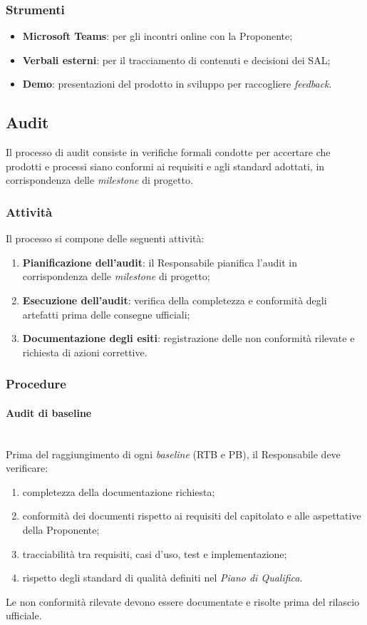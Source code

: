 \documentclass[10pt, letterpaper]{article}
\newcommand{\trisubsection}[1]{\paragraph{#1}\mbox{}\\}
\begin{document}
\subsubsection{Strumenti}
\begin{itemize}
    \item \textbf{Microsoft Teams}: per gli incontri online con la Proponente;
    \item \textbf{Verbali esterni}: per il tracciamento di contenuti e decisioni dei SAL;
    \item \textbf{Demo}: presentazioni del prodotto in sviluppo per raccogliere \textit{feedback}.
\end{itemize}


\subsection{Audit}
Il processo di audit consiste in verifiche formali condotte per accertare che prodotti e processi siano conformi ai requisiti e agli standard adottati, in corrispondenza delle \textit{milestone} di progetto.

\subsubsection{Attività}
Il processo si compone delle seguenti attività:
\begin{enumerate}
    \item \textbf{Pianificazione dell'audit}: il Responsabile pianifica l'audit in corrispondenza delle \textit{milestone} di progetto;
    \item \textbf{Esecuzione dell'audit}: verifica della completezza e conformità degli artefatti prima delle consegne ufficiali;
    \item \textbf{Documentazione degli esiti}: registrazione delle non conformità rilevate e richiesta di azioni correttive.
\end{enumerate}

\subsubsection{Procedure}

\trisubsection{Audit di baseline}
Prima del raggiungimento di ogni \textit{baseline} (RTB e PB), il Responsabile deve verificare:
\begin{enumerate}
    \item completezza della documentazione richiesta;
    \item conformità dei documenti rispetto ai requisiti del capitolato e alle aspettative della Proponente;
    \item tracciabilità tra requisiti, casi d'uso, test e implementazione;
    \item rispetto degli standard di qualità definiti nel \textit{Piano di Qualifica}.
\end{enumerate}
Le non conformità rilevate devono essere documentate e risolte prima del rilascio ufficiale.
\end{document}
